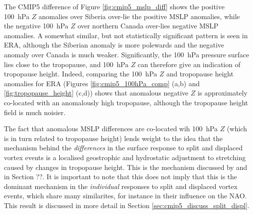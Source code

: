 The CMIP5 difference of Figure \ref{fig:cmip5_mslp_diff} shows the positive
100~hPa $Z$ anomalies over Siberia over-lie the positive MSLP anomalies, while
the negative 100~hPa $Z$ over northern Canada over-lies negative MSLP
anomalies. A somewhat similar, but not statistically significant pattern is seen
in ERA, although the Siberian anomaly is more polewards and the negative anomaly
over Canada is much weaker. Significantly, the 100~hPa pressure surface lies
close to the tropopause, and 100~hPa $Z$ can therefore give an indication of
tropopause height. Indeed, comparing the 100~hPa $Z$ and tropopause height
anomalies for ERA (Figures \ref{fig:cmip5_100hPa_comp} (a,b) and
\ref{fig:tropopause_height} (c,d)) shows that anomalous negative $Z$ is
approximately co-located with an anomalously high tropopause, although the
tropopause height field is much noisier. 

The fact that anomalous MSLP differences are co-located wih 100~hPa $Z$ (which
is in turn related to tropopause height) lends weight to the idea that the
mechanism behind the \emph{differences} in the surface response to split and
displaced vortex events is a localised geostrophic and hydrostatic adjustment to
stretching caused by changes in tropopause height. This is the mechanism
discussed by \citet{Ambaum2002} and in Section ??. It is important to note that
this does not imply that this is the dominant mechanism in the \emph{individual}
responses to split and displaced vortex events, which share many similarites, for
instance in their influence on the NAO. This result is discussed in more detail
in Section \ref{sec:cmip5_discuss_split_displ}.


